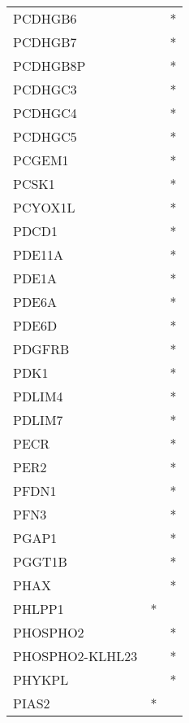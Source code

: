 \begin{longtable}{lcc}
PCDHGB6         &                &          * \\
PCDHGB7         &                &          * \\
PCDHGB8P        &                &          * \\
PCDHGC3         &                &          * \\
PCDHGC4         &                &          * \\
PCDHGC5         &                &          * \\
PCGEM1          &                &          * \\
PCSK1           &                &          * \\
PCYOX1L         &                &          * \\
PDCD1           &                &          * \\
PDE11A          &                &          * \\
PDE1A           &                &          * \\
PDE6A           &                &          * \\
PDE6D           &                &          * \\
PDGFRB          &                &          * \\
PDK1            &                &          * \\
PDLIM4          &                &          * \\
PDLIM7          &                &          * \\
PECR            &                &          * \\
PER2            &                &          * \\
PFDN1           &                &          * \\
PFN3            &                &          * \\
PGAP1           &                &          * \\
PGGT1B          &                &          * \\
PHAX            &                &          * \\
PHLPP1          &              * &            \\
PHOSPHO2        &                &          * \\
PHOSPHO2-KLHL23 &                &          * \\
PHYKPL          &                &          * \\
PIAS2           &              * &            \\

\end{longtable}
